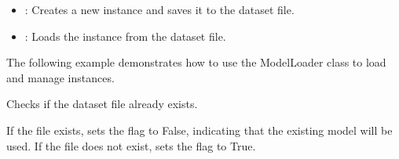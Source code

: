\documentclass[letterpaper,10pt,english]{sphinxmanual}
\begin{document}
\begin{fulllineitems}
\begin{description}
\begin{itemize}
\item {} 
\sphinxAtStartPar
{}: Creates a new  instance and saves it to the dataset file.

\item {} 
\sphinxAtStartPar
{}: Loads the  instance from the dataset file.

\end{itemize}

\sphinxAtStartPar
The following example demonstrates how to use the ModelLoader class to load and manage 
instances.

\begin{sphinxVerbatim}[commandchars=\\\{\}]
  
 
    
    
\end{sphinxVerbatim}

\end{description}

\begin{fulllineitems}
\label{\detokenize{ModelLoader:ModelLoader.ModelLoader.check_existing_model}}
\pysigstartsignatures
{}
\pysigstopsignatures
\sphinxAtStartPar
Checks if the dataset file already exists.
\begin{description}
\sphinxAtStartPar
If the file exists, sets the  flag to False, indicating that the existing model will be used.
If the file does not exist, sets the  flag to True.


\end{description}
\end{fulllineitems}
\end{fulllineitems}
\end{document}
